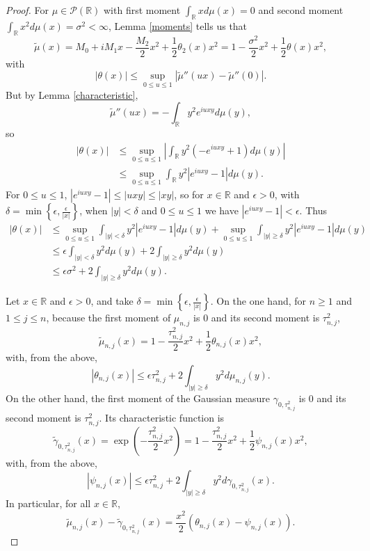 \documentclass{article}
\theoremstyle{definition}
\begin{document}
\begin{proof}
For $\mu \in \mathscr{P}(\mathbb{R})$ with
first moment $\int_\mathbb{R} x d\mu(x) =0$ and
second moment $\int_\mathbb{R} x^2 d\mu(x) = \sigma^2<\infty$, 
Lemma \ref{moments} tells us that 
\[
\tilde{\mu}(x) = M_0 + iM_1x - \frac{M_2}{2} x^2 + \frac{1}{2}\theta_2(x) x^2
=1-\frac{\sigma^2}{2} x^2 + \frac{1}{2} \theta(x) x^2,
\]
with 
\[
|\theta(x)| \leq \sup_{0 \leq u \leq 1} |\tilde{\mu}''(ux) - \tilde{\mu}''(0)|.
\]
But by Lemma \ref{characteristic}, 
\[
\tilde{\mu}''(ux) = -\int_\mathbb{R} y^2 e^{iuxy} d\mu(y),
\]
so
\begin{align*}
|\theta(x)| &\leq \sup_{0 \leq u \leq 1} \left| \int_\mathbb{R} y^2 (-e^{iuxy}+1) d\mu(y) \right|\\
&\leq \sup_{0 \leq u \leq 1} \int_\mathbb{R} y^2 |e^{iuxy} - 1| d\mu(y).
\end{align*}
For $0 \leq u \leq 1$, $|e^{iuxy}-1| \leq |uxy| \leq |xy|$, so for $x \in \mathbb{R}$ and
$\epsilon>0$, with $\delta=\min\left\{\epsilon,\frac{\epsilon}{|x|}\right\}$, when
$|y| < \delta$ and $0 \leq u \leq 1$ we have
$|e^{iuxy}-1| < \epsilon$. Thus
\begin{align*}
|\theta(x)| &\leq \sup_{0 \leq u \leq 1} \int_{|y| < \delta} y^2 |e^{iuxy}-1| d\mu(y)
+\sup_{0 \leq u \leq 1} \int_{|y| \geq \delta} y^2 |e^{iuxy}-1| d\mu(y)\\
&\leq \epsilon \int_{|y|<\delta} y^2 d\mu(y) + 2 \int_{|y| \geq \delta} y^2 d\mu(y)\\
&\leq \epsilon \sigma^2 + 2 \int_{|y| \geq \delta} y^2 d\mu(y).
\end{align*}

Let  $x \in \mathbb{R}$ and $\epsilon>0$, and take $\delta = \min\left\{\epsilon,\frac{\epsilon}{|x|} \right\}$.
On the one hand, for $n \geq 1$ and $1 \leq j \leq n$,
because the first moment of $\mu_{n,j}$ is $0$ and its second moment
is $\tau_{n,j}^2$,
\[
\tilde{\mu}_{n,j}(x) = 1 - \frac{\tau_{n,j}^2}{2} x^2 + \frac{1}{2} \theta_{n,j}(x) x^2,
\]
with, from the above,  
\[
|\theta_{n,j}(x)| \leq \epsilon \tau_{n,j}^2 + 2 \int_{|y| \geq \delta} y^2 d\mu_{n,j}(y).
\]
On the other hand,
the first moment of the Gaussian measure $\gamma_{0,\tau_{n,j}^2}$ is $0$ and its
second moment is $\tau_{n,j}^2$. Its characteristic function is
\[
\tilde{\gamma}_{0,\tau_{n,j}^2}(x) = \exp\left(-\frac{\tau_{n,j}^2}{2} x^2 \right) = 1-\frac{\tau_{n,j}^2}{2}x^2+\frac{1}{2}
\psi_{n,j}(x)x^2,
\]
with, from the above,
\[
|\psi_{n,j}(x)| \leq \epsilon \tau_{n,j}^2+2\int_{|y| \geq \delta} y^2 d\gamma_{0,\tau_{n,j}^2}(x).
\]
In particular, for all $x \in \mathbb{R}$,
\[
\tilde{\mu}_{n,j}(x) - \tilde{\gamma}_{0,\tau_{n,j}^2}(x) = \frac{x^2}{2}\left(\theta_{n,j}(x)-
\psi_{n,j}(x) \right).
\]


\end{proof}
\end{document}
